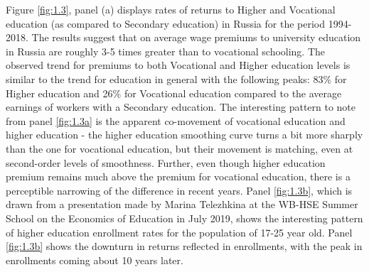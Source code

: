 \documentclass[12pt,a4paper]{article}
\numberwithin{equation}{section}
\begin{document}
Figure \ref{fig:1.3}, panel (a) displays rates of returns to Higher and Vocational education (as compared to Secondary education) in Russia for the period 1994-2018. The results suggest that on average wage premiums to university education in Russia are roughly 3-5 times greater than to vocational schooling. The observed trend for premiums to both Vocational and Higher education levels is similar to the trend for education in general with the following peaks: 83\% for Higher education and 26\% for Vocational education compared to the average earnings of workers with a Secondary education. The interesting pattern to note from panel \ref{fig:1.3a} is the apparent co-movement of vocational education and higher education - the higher education smoothing curve turns a bit more sharply than the one for vocational education, but their movement is matching, even at second-order levels of smoothness. Further, even though higher education premium remains much above the premium for vocational education, there is a perceptible narrowing of the difference in recent years. Panel \ref{fig:1.3b}, which is drawn from a presentation made by Marina Telezhkina at the WB-HSE Summer School on the Economics of Education in July 2019, shows the interesting pattern of higher education enrollment rates for the population of 17-25 year old. Panel \ref{fig:1.3b} shows the downturn in returns reflected in enrollments, with the peak in enrollments coming about 10 years later. 
\end{document}
